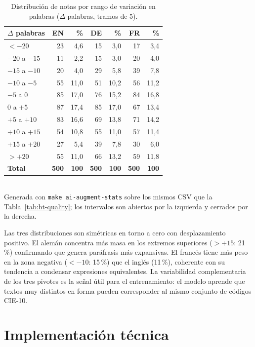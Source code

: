 \begin{table}[h]
\centering
\small
\caption{Distribución de notas por rango de variación en palabras ($\Delta$ palabras, tramos de 5).}
\label{tab:bt-dist}
\begin{tabular}{lrrrrrr}
\hline
\textbf{$\Delta$ palabras} & \textbf{EN} & \textbf{\%} & \textbf{DE} & \textbf{\%} & \textbf{FR} & \textbf{\%} \\
\hline
$< -20$        &  23 &  4,6 &  15 &  3,0 &  17 &  3,4 \\
$-20$ a $-15$  &  11 &  2,2 &  15 &  3,0 &  20 &  4,0 \\
$-15$ a $-10$  &  20 &  4,0 &  29 &  5,8 &  39 &  7,8 \\
$-10$ a $-5$   &  55 & 11,0 &  51 & 10,2 &  56 & 11,2 \\
$-5$ a $0$     &  85 & 17,0 &  76 & 15,2 &  84 & 16,8 \\
$0$ a $+5$     &  87 & 17,4 &  85 & 17,0 &  67 & 13,4 \\
$+5$ a $+10$   &  83 & 16,6 &  69 & 13,8 &  71 & 14,2 \\
$+10$ a $+15$  &  54 & 10,8 &  55 & 11,0 &  57 & 11,4 \\
$+15$ a $+20$  &  27 &  5,4 &  39 &  7,8 &  30 &  6,0 \\
$> +20$        &  55 & 11,0 &  66 & 13,2 &  59 & 11,8 \\
\hline
\textbf{Total} & \textbf{500} & \textbf{100} & \textbf{500} & \textbf{100} & \textbf{500} & \textbf{100} \\
\hline
\end{tabular}
\\[4pt]
{\footnotesize Generada con \texttt{make ai-augment-stats} sobre los mismos CSV que la Tabla~\ref{tab:bt-quality}; los intervalos son abiertos por la izquierda y cerrados por la derecha.}
\end{table}

Las tres distribuciones son simétricas en torno a cero con desplazamiento positivo. El alemán concentra más masa en los extremos superiores ($>+15$: 21\,\%) confirmando que genera paráfrasis más expansivas. El francés tiene más peso en la zona negativa ($< -10$: 15\,\%) que el inglés (11\,\%), coherente con su tendencia a condensar expresiones equivalentes. La variabilidad complementaria de los tres pivotes es la señal útil para el entrenamiento: el modelo aprende que textos muy distintos en forma pueden corresponder al mismo conjunto de códigos CIE-10.

\section{Implementación técnica}

